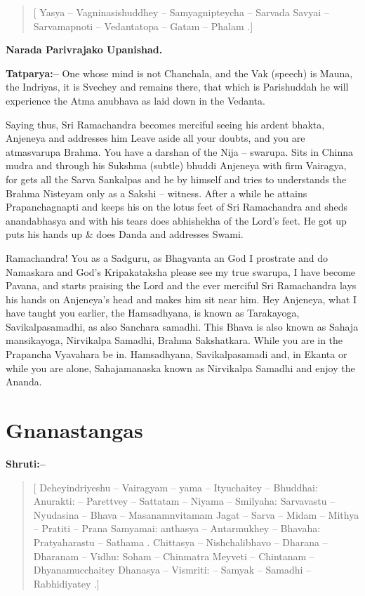\begin{verse}
[ Yasya – Vagninasishuddhey – Samyagnipteycha – Sarvada  Savyai – Sarvamapnoti – Vedantatopa – Gatam – Phalam .]
\end{verse}

\begin{flushright}
\textbf{Narada Parivrajako Upanishad.}
\end{flushright}

\textbf{Tatparya:–} One whose mind is not Chanchala, and the Vak (speech) is Mauna, the Indriyas, it is Svechey and remains there, that which is Parishuddah he will experience the Atma anubhava as laid down in the Vedanta.

Saying thus, Sri Ramachandra becomes merciful seeing his ardent bhakta, Anjeneya and addresses him Leave aside all your doubts, and you are atmasvarupa Brahma. You have a darshan of the Nija – swarupa. Sits in Chinna mudra and through his Sukshma (subtle) bhuddi Anjeneya with firm Vairagya, for gets all the Sarva Sankalpas and he by himself and tries to understands the Brahma Nisteyam only as a Sakshi – witness. After a while he attains Prapanchagnapti and keeps his on the lotus feet of Sri Ramachandra and sheds anandabhasya and with his tears does abhishekha of the Lord's feet. He got up puts his hands up \& does Danda and addresses Swami.

Ramachandra! You as a Sadguru, as Bhagvanta an God I prostrate and do Namaskara and God's Kripakataksha please see my true swarupa, I have become Pavana, and starts praising the Lord and the ever merciful Sri Ramachandra lays his hands on Anjeneya's head and makes him sit near him. Hey Anjeneya, what I have taught you earlier, the Hamsadhyana, is known as Tarakayoga, Savikalpasamadhi, as also Sanchara samadhi. This Bhava is also known as Sahaja mansikayoga, Nirvikalpa Samadhi, Brahma Sakshatkara. While you are in the Prapancha Vyavahara be in. Hamsadhyana, Savikalpasamadi and, in Ekanta or while you are alone, Sahajamanaska known as Nirvikalpa Samadhi and enjoy the Ananda.

\chapter{Gnanastangas}

\textbf{Shruti:–}

\begin{verse}
[ Deheyindriyeshu – Vairagyam – yama – Ityuchaitey – Bhuddhai:  Anurakti: – Parettvey – Sattatam – Niyama – Smilyaha:  Sarvavastu – Nyudasina – Bhava – Masanamnvitamam  Jagat – Sarva – Midam – Mithya – Pratiti – Prana Samyamai:  anthasya – Antarmukhey – Bhavaha: Pratyaharastu – Sathama . Chittasya – Nishchalibhavo – Dharana – Dharanam – Vidhu:  Soham – Chinmatra Meyveti – Chintanam – Dhyanamucchaitey Dhanasya – Vismriti: – Samyak – Samadhi – Rabhidiyatey .]
\end{verse}

